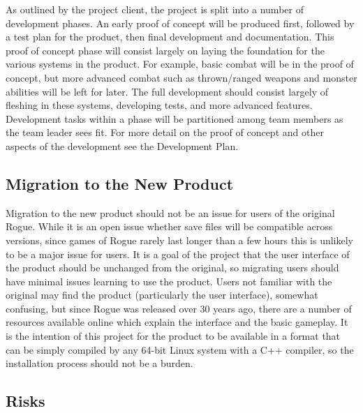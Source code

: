\documentclass[12pt, titlepage]{article}
\begin{document}
		As outlined by the project client, the project is split into a number of development phases. An early proof of concept will be produced first, followed by a test plan for the product, then final development and documentation. This proof of concept phase will consist largely on laying the foundation for the various systems in the product. For example, basic combat will be in the proof of concept, but more advanced combat such as thrown/ranged weapons and monster abilities will be left for later. The full development should consist largely of fleshing in these systems, developing tests, and more advanced features. Development tasks within a phase will be partitioned among team members as the team leader sees fit. For more detail on the proof of concept and other aspects of the development see the Development Plan.

	\subsection{Migration to the New Product}

		Migration to the new product should not be an issue for users of the original Rogue. While it is an open issue whether save files will be compatible across versions, since games of Rogue rarely last longer than a few hours this is unlikely to be a major issue for users. It is a goal of the project that the user interface of the product should be unchanged from the original, so migrating users should have minimal issues learning to use the product. Users not familiar with the original may find the product (particularly the user interface), somewhat confusing, but since Rogue was released over 30 years ago, there are a number of resources available online which explain the interface and the basic gameplay. It is the intention of this project for the product to be available in a format that can be simply compiled by any 64-bit Linux system with a C++ compiler, so the installation process should not be a burden.

	\subsection{Risks}
\end{document}
